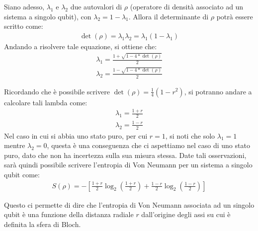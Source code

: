 Siano adesso, \(\lambda_1\) e \(\lambda_2\) due autovalori di \(\rho\) (operatore di densità associato ad un sistema a singolo qubit), con \(\lambda_2 = 1 - \lambda_1\). Allora il determinante di \(\rho\) potrà essere scritto come:
\begin{gather*}
\det(\rho) = \lambda_1 \lambda_2 = \lambda_1 (1 - \lambda_1)
\end{gather*}
Andando a risolvere tale equazione, si ottiene che:
\begin{gather*}
    \lambda_1 = \frac{1 + \sqrt{1 - 4*\det(\rho)}}{2}\\
    \lambda_2 = \frac{1 - \sqrt{1 - 4*\det(\rho)}}{2}
\end{gather*}

Ricordando che è possibile scrivere \(\det(\rho) = \frac{1}{4}(1-r^2)\), si potranno andare a calcolare tali lambda come:
\begin{gather*}
    \lambda_1 = \frac{1 + r}{2}\\
    \lambda_2 = \frac{1 - r}{2}
\end{gather*}
Nel caso in cui si abbia uno stato puro, per cui \(r=1\), si noti che solo \(\lambda_1 = 1\) mentre \(\lambda_2 = 0\), questa è una conseguenza che ci aspettiamo nel caso di uno stato puro, dato che non ha incertezza sulla sua misura stessa. 
Date tali osservazioni, sarà quindi possibile scrivere l'entropia di Von Neumann per un sistema a singolo qubit come:
\begin{gather*}
    S(\rho) = - \left[\frac{1 + r}{2}\log_2\left(\frac{1 + r}{2}\right) + \frac{1-r}{2}\log_2\left(\frac{1 - r}{2}\right)\right]
\end{gather*}

Questo ci permette di dire che l'entropia di Von Neumann associata ad un singolo qubit è una funzione della distanza radiale \(r\) dall'origine degli assi su cui è definita la sfera di Bloch.

